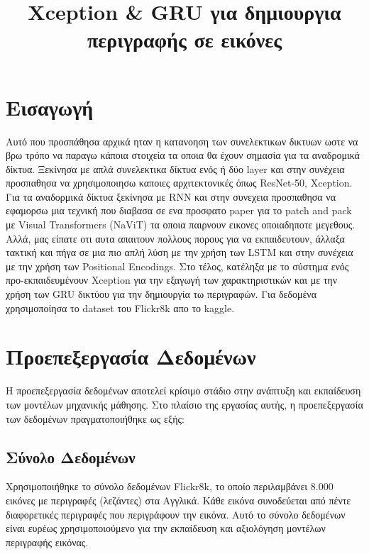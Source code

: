 \documentclass[conference]{IEEEtran}
\begin{document}

\title{\textlatin{Xception \& GRU} για δημιουργια περιγραφής σε εικόνες}
\author{
}

\maketitle

\section{Εισαγωγή}
Αυτό που προσπάθησα αρχικά ηταν η κατανοηση των συνελεκτικων δικτυων ωστε να βρω τρόπο να παραγω κάποια στοιχεία τα οποια θα έχουν σημασία για τα αναδρομικά δίκτυα. Ξεκίνησα με απλά συνελεκτικα δίκτυα ενός ή δύο \textlatin{layer} και στην συνέχεια προσπαθησα να χρησιμοποιησω καποιες αρχιτεκτονικές όπως \textlatin{ResNet-50}, \textlatin{Xception}. Για τα αναδορμικά δίκτυα ξεκίνησα με \textlatin{RNN} και στην συνεχεια προσπαθησα να εφαμορσω μια τεχνική που διαβασα σε ενα προσφατο \textlatin{paper} για το \textlatin{patch and pack} με \textlatin{Visual Transformers (NaViT)} τα οποια παιρνουν εικονες οποιαδηποτε μεγεθους. Αλλά, μας είπατε οτι αυτα απαιτουν πολλους πορους για να εκπαιδευτουν, άλλαξα τακτική και πήγα σε μια πιο απλή λύση με την χρήση των \textlatin{LSTM} και στην συνέχεια με την χρήση των \textlatin{Positional Encodings}. Στο τέλος, κατέληξα με το σύστημα ενός προ-εκπαιδευμένουν \textlatin{Xception} για την εξαγωγή των χαρακτηριστικών και με την χρήση των \textlatin{GRU} δικτύου για την δημιουργία τω περιγραφών. Για δεδομένα χρησιμοποίησα το \textlatin{dataset} του \textlatin{Flickr8k} απο το \textlatin{kaggle}.

\section{Προεπεξεργασία Δεδομένων}

Η προεπεξεργασία δεδομένων αποτελεί κρίσιμο στάδιο στην ανάπτυξη και εκπαίδευση των μοντέλων μηχανικής μάθησης. Στο πλαίσιο της εργασίας αυτής, η προεπεξεργασία των δεδομένων πραγματοποιήθηκε ως εξής:

\subsection{Σύνολο Δεδομένων}
Χρησιμοποιήθηκε το σύνολο δεδομένων \textlatin{Flickr8k}, το οποίο περιλαμβάνει 8.000 εικόνες με περιγραφές (λεζάντες) στα Αγγλικά. Κάθε εικόνα συνοδεύεται από πέντε διαφορετικές περιγραφές που περιγράφουν την εικόνα. Αυτό το σύνολο δεδομένων είναι ευρέως χρησιμοποιούμενο για την εκπαίδευση και αξιολόγηση μοντέλων περιγραφής εικόνας.
\end{document}

